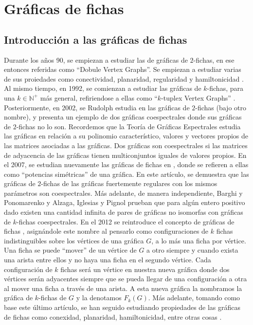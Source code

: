 \chapter{Gr\'aficas de fichas}%
\label{cap:fichass}

\section{Introducci\'on a las gr\'aficas de fichas}%
\label{sec:intro-fichas}


    Durante los a\~{n}os 90, se empiezan a estudiar las de gr\'aficas de
$2$-fichas, en ese entonces referidas como ``Dobule Vertex Graphs''. Se empiezan
a estudiar varias de sus proiedades como conectividad, planaridad, regularidad y
hamiltonicidad \cite{alaviPlanarity, alaviDVGraphs, alaviHamilt, zhuConnect}. Al
mismo tiempo, en 1992, se comienzan a estudiar las gr\'aficas de $k$-fichas,
para una $k \in \mathbb{N^{+}}$ m\'as general, refiriendose a ellas como
``$k$-tuplex Vertex Graphs'' \cite{zhuNTuples}. Posteriormente, en 2002, se
Rudolph estudia en \cite{rudolphGInv} las gr\'aficas de $2$-fichas (bajo otro
nombre), y presenta un ejemplo de dos gr\'aficas coespectrales donde sus
gr\'aficas de $2$-fichas no lo son. Recordemos que la Teor\'ia de Gr\'aficas
Espectrales estudia las gr\'aficas en relaci\'on a su polinomio
caracter\'istico, valores y vectores propios de las matrices asociadas a las
gr\'aficas. Dos gr\'aficas son coespectrales si las matrices de adyacencia de
las gr\'aficas tienen multiconjuntos iguales de valores propios. En el 2007, se
estudian nuevamente las gr\'aficas de fichas en \cite{audeanetSymPower}, donde
se refieren a ellas como ``potencias sim\'etricas'' de una gr\'afica. En este
art\'iculo, se demuestra que las gr\'aficas de $2$-fichas de las gr\'aficas
fuertemente regulares con los mismos par\'ametros son coespectrales. M\'as
adelante, de manera independiente, Barghi y Ponomarenko
\cite{barghi-ponomarenko} y Alzaga, Iglesias y Pignol \cite{alzagaSymPower}
prueban que para alg\'un entero positivo dado existen una cantidad infinita de
pares de gr\'aficas no isomorfas con gr\'aficas de $k$-fichas coespectrales. En
el 2012 se reintroduce el concepto de gr\'aficas de fichas \cite{fabilaToken},
asign\'andole este nombre al pensarlo como configuraciones de $k$ fichas
indistinguibles sobre los v\'ertices de una gr\'afica $G$, a lo m\'as una ficha
por v\'ertice. Una ficha se puede ``mover'' de un v\'ertice de $G$ a otro
siempre y cuando exista una arista entre ellos y no haya una ficha en el segundo
v\'ertice. Cada configuraci\'on de $k$ fichas ser\'a un v\'ertice en nuestra
nueva gr\'afica donde dos v\'ertices ser\'an adyacentes siempre que se pueda
llegar de una configuraci\'on a otra al mover una ficha a trav\'es de una
arista. A esta nueva gr\'afica la nombramos la gr\'afica de $k$-fichas de $G$ y
la denotamos $F_k(G)$. M\'as adelante, tomando como base este \'ultimo
art\'iculo, se han seguido estudiando propiedades de las gr\'aficas de fichas
como conexidad, planaridad, hamiltonicidad, entre otras cosas
\cite{carballosaRegPlan, leaConnect, riveraHamilt, adameHamilt, leaEConnect}.

